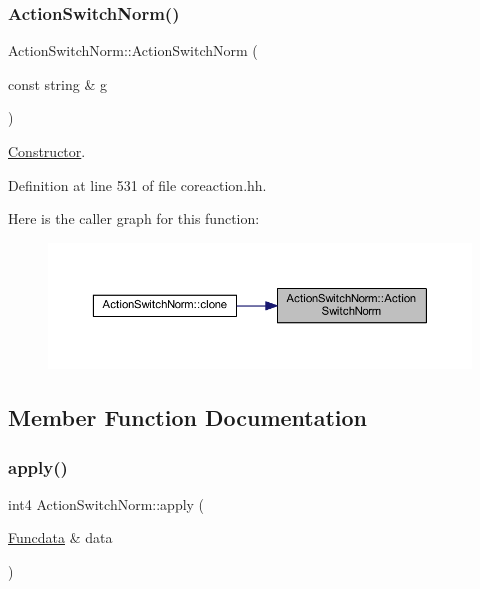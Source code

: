 \subsubsection{\texorpdfstring{ActionSwitchNorm()}{ActionSwitchNorm()}}
{\footnotesize\ttfamily Action\+Switch\+Norm\+::\+Action\+Switch\+Norm (\begin{DoxyParamCaption}\item[{const string \&}]{g }\end{DoxyParamCaption})\hspace{0.3cm}{\ttfamily [inline]}}



\mbox{\hyperlink{class_constructor}{Constructor}}. 



Definition at line 531 of file coreaction.\+hh.

Here is the caller graph for this function\+:
\nopagebreak
\begin{figure}[H]
\begin{center}
\leavevmode
\includegraphics[width=350pt]{class_action_switch_norm_a7db627e235f195d28ddf1d447d2aff3d_icgraph}
\end{center}
\end{figure}


\subsection{Member Function Documentation}
\mbox{\label{class_action_switch_norm_afbafe42ea6a6c25321775656d0a1f6cb}} 
\subsubsection{\texorpdfstring{apply()}{apply()}}
{\footnotesize\ttfamily int4 Action\+Switch\+Norm\+::apply (\begin{DoxyParamCaption}\item[{\mbox{\hyperlink{class_funcdata}{Funcdata}} \&}]{data }\end{DoxyParamCaption})\hspace{0.3cm}{\ttfamily [virtual]}}



